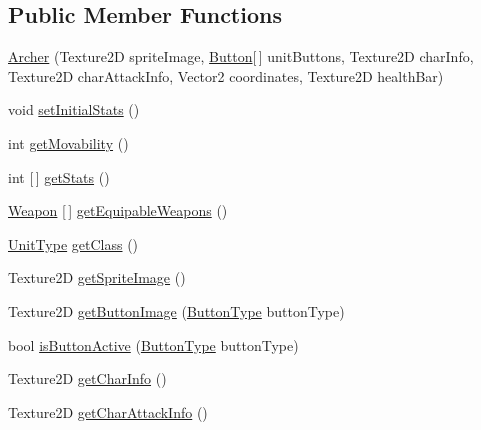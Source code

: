 \subsection*{Public Member Functions}
\begin{DoxyCompactItemize}
\item 
\hyperlink{class_model_1_1_unit_module_1_1_archer_acb9f7b98dd16e29be30ee2fd97ce0cbc}{Archer} (Texture2D sprite\+Image, \hyperlink{class_model_1_1_button}{Button}\mbox{[}$\,$\mbox{]} unit\+Buttons, Texture2D char\+Info, Texture2D char\+Attack\+Info, Vector2 coordinates, Texture2D health\+Bar)
\item 
void \hyperlink{class_model_1_1_unit_module_1_1_archer_acd305143313040a061b7482039c7a9b6}{set\+Initial\+Stats} ()
\item 
int \hyperlink{class_model_1_1_unit_module_1_1_archer_a54970d1557f24e41507c5bd056ac1f03}{get\+Movability} ()
\item 
int \mbox{[}$\,$\mbox{]} \hyperlink{class_model_1_1_unit_module_1_1_archer_a1b339759429e0a031aadf2b3e2505e66}{get\+Stats} ()
\item 
\hyperlink{interface_model_1_1_weapon_module_1_1_weapon}{Weapon} \mbox{[}$\,$\mbox{]} \hyperlink{class_model_1_1_unit_module_1_1_archer_a470c428226089a8872e1bc3901388196}{get\+Equipable\+Weapons} ()
\item 
\hyperlink{namespace_model_1_1_unit_module_aba9769f408747bf38d0d8adca8f68c98}{Unit\+Type} \hyperlink{class_model_1_1_unit_module_1_1_archer_a2211d99610a907939dac87cb75c3afb1}{get\+Class} ()
\item 
Texture2D \hyperlink{class_model_1_1_unit_module_1_1_archer_a2a400bdeef5aaaa34ffe6428ecaaf2c2}{get\+Sprite\+Image} ()
\item 
Texture2D \hyperlink{class_model_1_1_unit_module_1_1_archer_a6890f21c7dd51b1e22fed4047906f85f}{get\+Button\+Image} (\hyperlink{namespace_model_ac76b3489c9d704f49912608bd36cd0e7}{Button\+Type} button\+Type)
\item 
bool \hyperlink{class_model_1_1_unit_module_1_1_archer_ae3a17a1d3f60e9e35e0d25c45158a8eb}{is\+Button\+Active} (\hyperlink{namespace_model_ac76b3489c9d704f49912608bd36cd0e7}{Button\+Type} button\+Type)
\item 
Texture2D \hyperlink{class_model_1_1_unit_module_1_1_archer_acfcb3e900ee60c0bd9ed800efc9abcac}{get\+Char\+Info} ()
\item 
Texture2D \hyperlink{class_model_1_1_unit_module_1_1_archer_aafb7e46f581d1710a16d054dfef03ddf}{get\+Char\+Attack\+Info} ()
\item 

\end{DoxyCompactItemize}

